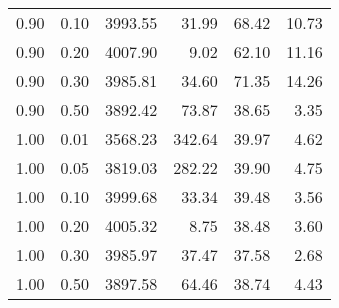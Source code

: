 \begin{table}
\begin{tabular}{rrrrrr}
0.90 & 0.10 & 3993.55 & 31.99 & 68.42 & 10.73 \\
0.90 & 0.20 & 4007.90 & 9.02 & 62.10 & 11.16 \\
0.90 & 0.30 & 3985.81 & 34.60 & 71.35 & 14.26 \\
0.90 & 0.50 & 3892.42 & 73.87 & 38.65 & 3.35 \\
1.00 & 0.01 & 3568.23 & 342.64 & 39.97 & 4.62 \\
1.00 & 0.05 & 3819.03 & 282.22 & 39.90 & 4.75 \\
1.00 & 0.10 & 3999.68 & 33.34 & 39.48 & 3.56 \\
1.00 & 0.20 & 4005.32 & 8.75 & 38.48 & 3.60 \\
1.00 & 0.30 & 3985.97 & 37.47 & 37.58 & 2.68 \\
1.00 & 0.50 & 3897.58 & 64.46 & 38.74 & 4.43 \\
\bottomrule
\end{tabular}
\end{table}
